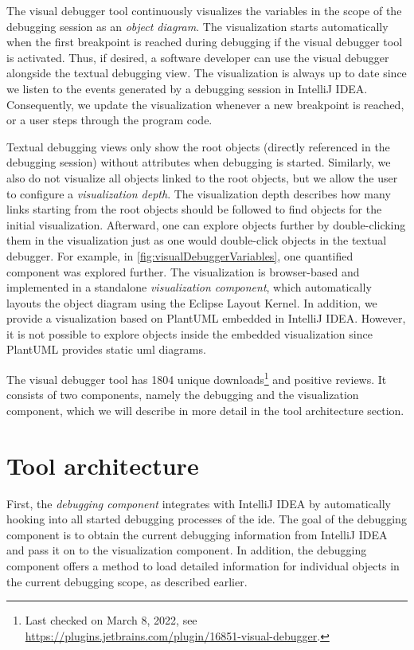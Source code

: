 \documentclass[conference]{IEEEtran}
\newcommand{\intellij}{IntelliJ IDEA}
\begin{document}
The visual debugger tool continuously visualizes the variables in the scope of the debugging session as an \textit{object diagram}.
The visualization starts automatically when the first breakpoint is reached during debugging if the visual debugger tool is activated.
Thus, if desired, a software developer can use the visual debugger alongside the textual debugging view.
The visualization is always up to date since we listen to the events generated by a debugging session in \intellij{}.
Consequently, we update the visualization whenever a new breakpoint is reached, or a user steps through the program code.

Textual debugging views only show the root objects (directly referenced in the debugging session) without attributes when debugging is started.
Similarly, we also do not visualize all objects linked to the root objects, but we allow the user to configure a \textit{visualization depth}.
The visualization depth describes how many links starting from the root objects should be followed to find objects for the initial visualization.
Afterward, one can explore objects further by double-clicking them in the visualization just as one would double-click objects in the textual debugger.
For example, in \autoref{fig:visualDebuggerVariables}, one quantified component was explored further.
The visualization is browser-based and implemented in a standalone \textit{visualization component}, which automatically layouts the object diagram using the Eclipse Layout Kernel.
In addition, we provide a visualization based on PlantUML embedded in \intellij{}.
However, it is not possible to explore objects inside the embedded visualization since PlantUML provides static \gls*{uml} diagrams.


The visual debugger tool has 1804 unique downloads\footnote{Last checked on March 8, 2022, see \url{https://plugins.jetbrains.com/plugin/16851-visual-debugger}.} and positive reviews.
It consists of two components, namely the debugging and the visualization component, which we will describe in more detail in the tool architecture section.

\section{Tool architecture}  \label{sec:architecture}
First, the \textit{debugging component} integrates with \intellij{} by automatically hooking into all started debugging processes of the \gls*{ide}.
The goal of the debugging component is to obtain the current debugging information from \intellij{} and pass it on to the visualization component.
In addition, the debugging component offers a method to load detailed information for individual objects in the current debugging scope, as described earlier.
\end{document}
